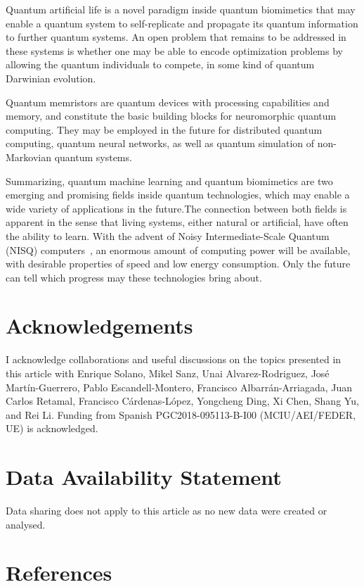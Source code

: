 \documentclass[12pt]{iopart}
\begin{document}
Quantum artificial life is a novel paradigm inside quantum biomimetics that may enable a quantum system to self-replicate and propagate its quantum information to further quantum systems. An open problem that remains to be addressed in these systems is whether one may be able to encode optimization problems by allowing the quantum individuals to compete, in some kind of quantum Darwinian evolution.

Quantum memristors are quantum devices with processing capabilities and memory, and constitute the basic building blocks for neuromorphic quantum computing. They may be employed in the future for distributed quantum computing, quantum neural networks, as well as quantum simulation of non-Markovian quantum systems.

Summarizing, quantum machine learning and quantum biomimetics are two emerging and promising fields inside quantum technologies, which may enable a wide variety of applications in the future.The connection between both fields is apparent in the sense that living systems, either natural or artificial, have often the ability to learn. With the advent of Noisy Intermediate-Scale Quantum (NISQ) computers~\cite{NISQ}, an enormous amount of computing power will be available, with desirable properties of speed and low energy consumption. Only the future can tell which progress may these technologies bring about.


\section*{Acknowledgements} I acknowledge collaborations and useful discussions on the topics presented in this article with Enrique Solano, Mikel Sanz, Unai Alvarez-Rodriguez, Jos\'e Mart\'in-Guerrero, Pablo Escandell-Montero, Francisco Albarr\'an-Arriagada, Juan Carlos Retamal, Francisco C\'ardenas-L\'opez, Yongcheng Ding, Xi Chen, Shang Yu, and Rei Li. Funding from Spanish PGC2018-095113-B-I00 (MCIU/AEI/FEDER, UE) is acknowledged.

\section*{Data Availability Statement}

Data sharing does not apply to this article as no new data were created or analysed.



\section*{References}
\end{document}
